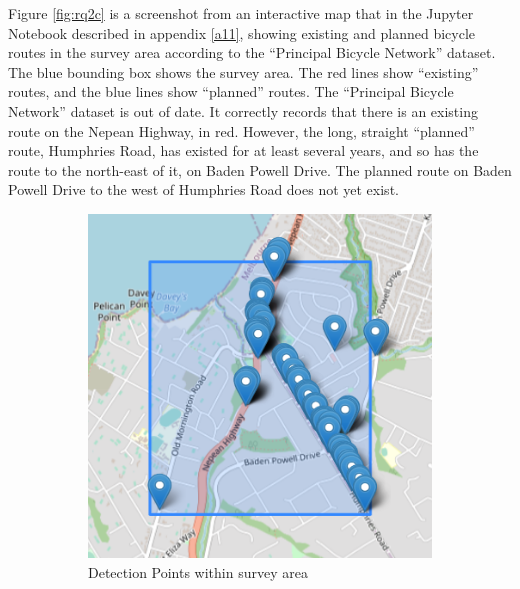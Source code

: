 \documentclass[11pt,twoside]{report}
\begin{document}
Figure \ref{fig:rq2c} is a screenshot from an interactive map that in the Jupyter Notebook described in appendix \ref{a11}, showing existing and planned bicycle routes in the survey area according to the ``Principal Bicycle Network'' dataset.  The blue bounding box shows the survey area.  The red lines show ``existing'' routes, and the blue lines show ``planned'' routes.  The ``Principal Bicycle Network'' dataset is out of date.  It correctly records that there is an existing route on the Nepean Highway, in red.  However, the long, straight ``planned'' route, Humphries Road, has existed for at least several years, and so has the route to the north-east of it, on Baden Powell Drive.  The planned route on Baden Powell Drive to the west of Humphries Road does not yet exist.

\begin{figure}[h]
\centering
\begin{subfigure}{0.45\textwidth}
	\includegraphics[width=\textwidth]{map1_1.png}
	\caption{Detection Points within survey area}
	\label{fig:rq2a}
\end{subfigure}
\hfill
\begin{subfigure}{0.45\textwidth}

\end{subfigure}
\end{figure}
\end{document}
